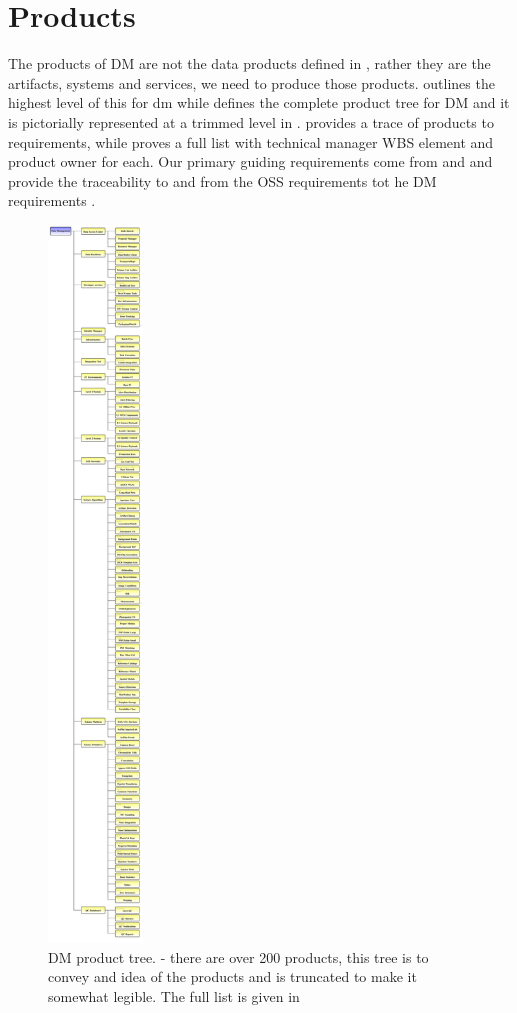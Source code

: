 \section{Products \label{sect:products}}

The products of DM are not the data products defined in , rather they are the artifacts, systems and services,  we need to produce those products.  outlines the highest level of this for dm while    defines the complete product tree for DM and it is pictorially represented at a trimmed level in  .
 provides a trace of products to requirements, while  proves a full list with technical manager WBS element and product owner for each.
Our primary guiding requirements come from  and  and  provide the traceability to and from the OSS requirements tot he DM requirements .

\begin{figure}[htbp]
	\begin{center}
		 \includegraphics[height=19cm]{ProductTree}
		 \caption{DM product tree. \label{fig:prods}- there are over 200 products, this tree is to convey and idea of the products and is truncated to make it somewhat legible.
		 The full list is given in 
	 }

	 \end{center}
 \end{figure}

